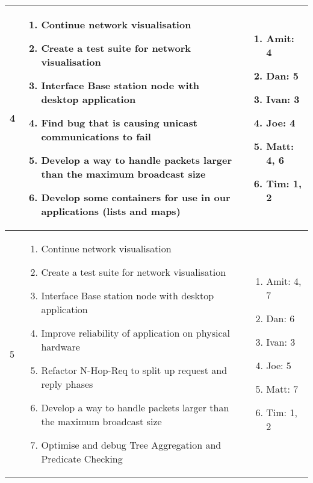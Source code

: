 \begin{center}
\begin{longtable}{| l | p{7.5cm} | p{5cm} |}
	4 & \begin{enumerate}
		\item Continue network visualisation
		\item Create a test suite for network visualisation
		\item Interface Base station node with desktop application
		\item Find bug that is causing unicast communications to fail
		\item Develop a way to handle packets larger than the maximum broadcast size
		\item Develop some containers for use in our applications (lists and maps)
		\end{enumerate} &
	\begin{enumerate}
		\item[] Amit: 4
		\item[] Dan: 5
		\item[] Ivan: 3
		\item[] Joe: 4
		\item[] Matt: 4, 6
		\item[] Tim: 1, 2
	\end{enumerate}
	\\ \hline

	5 & \begin{enumerate}
		\item Continue network visualisation
		\item Create a test suite for network visualisation
		\item Interface Base station node with desktop application
		\item Improve reliability of application on physical hardware
		\item Refactor N-Hop-Req to split up request and reply phases
		\item Develop a way to handle packets larger than the maximum broadcast size
		\item Optimise and debug Tree Aggregation and Predicate Checking
		\end{enumerate} &
	\begin{enumerate}
		\item[] Amit: 4, 7
		\item[] Dan: 6
		\item[] Ivan: 3
		\item[] Joe: 5
		\item[] Matt: 7
		\item[] Tim: 1, 2
	\end{enumerate}
	\\ \hline


\end{longtable}
\end{center}
